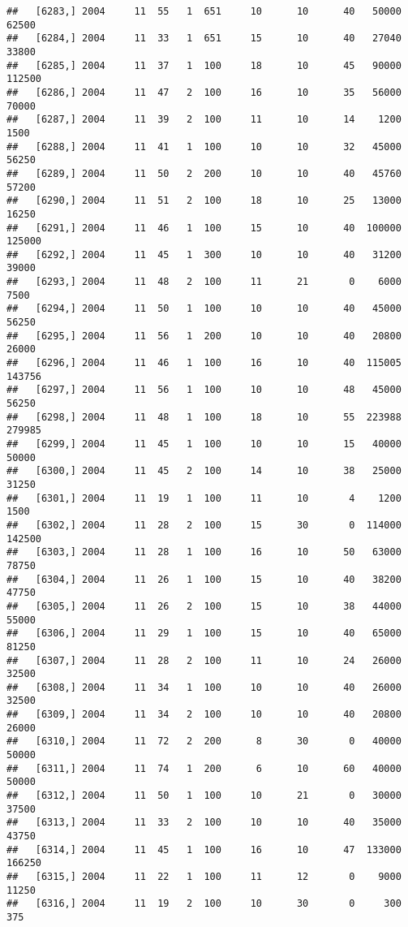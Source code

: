\documentclass{article}\usepackage[]{graphicx}\usepackage[]{color}
\makeatletter
\newenvironment{kframe}{%
 \def\at@end@of@kframe{}%
 \ifinner\ifhmode%
  \def\at@end@of@kframe{\end{minipage}}%
  \begin{minipage}{\columnwidth}%
 \fi\fi%
 \def\FrameCommand##1{\hskip\@totalleftmargin \hskip-\fboxsep
 \colorbox{shadecolor}{##1}\hskip-\fboxsep
     \hskip-\linewidth \hskip-\@totalleftmargin \hskip\columnwidth}%
 \MakeFramed {\advance\hsize-\width
   \@totalleftmargin\z@ \linewidth\hsize
   \@setminipage}}%
 {\par\unskip\endMakeFramed%
 \at@end@of@kframe}
\newenvironment{knitrout}{}{} %
\makeatother
\begin{document}
\begin{knitrout}
\begin{kframe}
\begin{verbatim}
##   [6283,] 2004     11  55   1  651     10      10      40   50000   62500
##   [6284,] 2004     11  33   1  651     15      10      40   27040   33800
##   [6285,] 2004     11  37   1  100     18      10      45   90000  112500
##   [6286,] 2004     11  47   2  100     16      10      35   56000   70000
##   [6287,] 2004     11  39   2  100     11      10      14    1200    1500
##   [6288,] 2004     11  41   1  100     10      10      32   45000   56250
##   [6289,] 2004     11  50   2  200     10      10      40   45760   57200
##   [6290,] 2004     11  51   2  100     18      10      25   13000   16250
##   [6291,] 2004     11  46   1  100     15      10      40  100000  125000
##   [6292,] 2004     11  45   1  300     10      10      40   31200   39000
##   [6293,] 2004     11  48   2  100     11      21       0    6000    7500
##   [6294,] 2004     11  50   1  100     10      10      40   45000   56250
##   [6295,] 2004     11  56   1  200     10      10      40   20800   26000
##   [6296,] 2004     11  46   1  100     16      10      40  115005  143756
##   [6297,] 2004     11  56   1  100     10      10      48   45000   56250
##   [6298,] 2004     11  48   1  100     18      10      55  223988  279985
##   [6299,] 2004     11  45   1  100     10      10      15   40000   50000
##   [6300,] 2004     11  45   2  100     14      10      38   25000   31250
##   [6301,] 2004     11  19   1  100     11      10       4    1200    1500
##   [6302,] 2004     11  28   2  100     15      30       0  114000  142500
##   [6303,] 2004     11  28   1  100     16      10      50   63000   78750
##   [6304,] 2004     11  26   1  100     15      10      40   38200   47750
##   [6305,] 2004     11  26   2  100     15      10      38   44000   55000
##   [6306,] 2004     11  29   1  100     15      10      40   65000   81250
##   [6307,] 2004     11  28   2  100     11      10      24   26000   32500
##   [6308,] 2004     11  34   1  100     10      10      40   26000   32500
##   [6309,] 2004     11  34   2  100     10      10      40   20800   26000
##   [6310,] 2004     11  72   2  200      8      30       0   40000   50000
##   [6311,] 2004     11  74   1  200      6      10      60   40000   50000
##   [6312,] 2004     11  50   1  100     10      21       0   30000   37500
##   [6313,] 2004     11  33   2  100     10      10      40   35000   43750
##   [6314,] 2004     11  45   1  100     16      10      47  133000  166250
##   [6315,] 2004     11  22   1  100     11      12       0    9000   11250
##   [6316,] 2004     11  19   2  100     10      30       0     300     375

\end{verbatim}
\end{kframe}
\end{knitrout}
\end{document}
